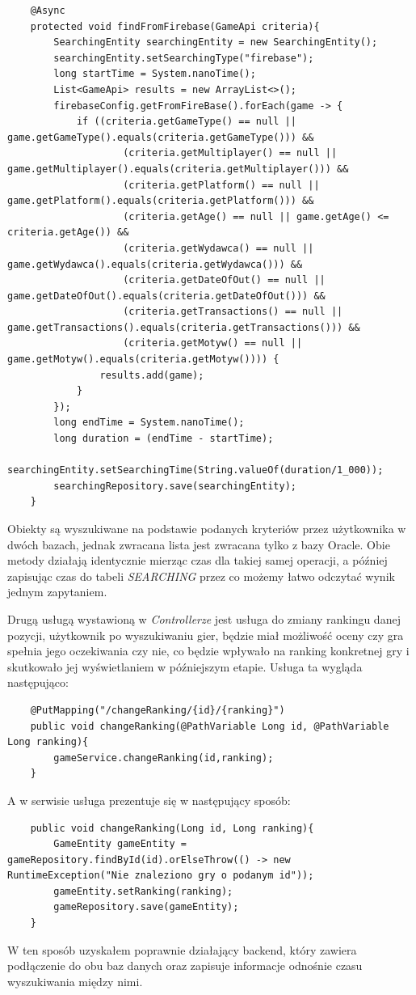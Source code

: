 \begin{lstlisting}
    @Async
    protected void findFromFirebase(GameApi criteria){
        SearchingEntity searchingEntity = new SearchingEntity();
        searchingEntity.setSearchingType("firebase");
        long startTime = System.nanoTime();
        List<GameApi> results = new ArrayList<>();
        firebaseConfig.getFromFireBase().forEach(game -> {
            if ((criteria.getGameType() == null || game.getGameType().equals(criteria.getGameType())) &&
                    (criteria.getMultiplayer() == null || game.getMultiplayer().equals(criteria.getMultiplayer())) &&
                    (criteria.getPlatform() == null || game.getPlatform().equals(criteria.getPlatform())) &&
                    (criteria.getAge() == null || game.getAge() <= criteria.getAge()) &&
                    (criteria.getWydawca() == null || game.getWydawca().equals(criteria.getWydawca())) &&
                    (criteria.getDateOfOut() == null || game.getDateOfOut().equals(criteria.getDateOfOut())) &&
                    (criteria.getTransactions() == null || game.getTransactions().equals(criteria.getTransactions())) &&
                    (criteria.getMotyw() == null || game.getMotyw().equals(criteria.getMotyw()))) {
                results.add(game);
            }
        });
        long endTime = System.nanoTime();
        long duration = (endTime - startTime);
        searchingEntity.setSearchingTime(String.valueOf(duration/1_000));
        searchingRepository.save(searchingEntity);
    }
\end{lstlisting}

Obiekty są wyszukiwane na podstawie podanych kryteriów przez użytkownika w dwóch bazach, jednak zwracana lista jest zwracana tylko z bazy Oracle. Obie metody działają identycznie mierząc czas dla takiej samej operacji, a później zapisując czas do tabeli \textit{SEARCHING} przez co możemy łatwo odczytać wynik jednym zapytaniem.

Drugą usługą wystawioną w \textit{Controllerze} jest usługa do zmiany rankingu danej pozycji, użytkownik po wyszukiwaniu gier, będzie miał możliwość oceny czy gra spełnia jego oczekiwania czy nie, co będzie wpływało na ranking konkretnej gry i skutkowało jej wyświetlaniem w późniejszym etapie. Usługa ta wygląda następująco:
\begin{lstlisting}
    @PutMapping("/changeRanking/{id}/{ranking}")
    public void changeRanking(@PathVariable Long id, @PathVariable Long ranking){
        gameService.changeRanking(id,ranking);
    }
\end{lstlisting}
A w serwisie usługa prezentuje się w następujący sposób:
\begin{lstlisting}
    public void changeRanking(Long id, Long ranking){
        GameEntity gameEntity = gameRepository.findById(id).orElseThrow(() -> new RuntimeException("Nie znaleziono gry o podanym id"));
        gameEntity.setRanking(ranking);
        gameRepository.save(gameEntity);
    }
\end{lstlisting}
W ten sposób uzyskałem poprawnie działający backend, który zawiera podłączenie do obu baz danych oraz zapisuje informacje odnośnie czasu wyszukiwania między nimi.

